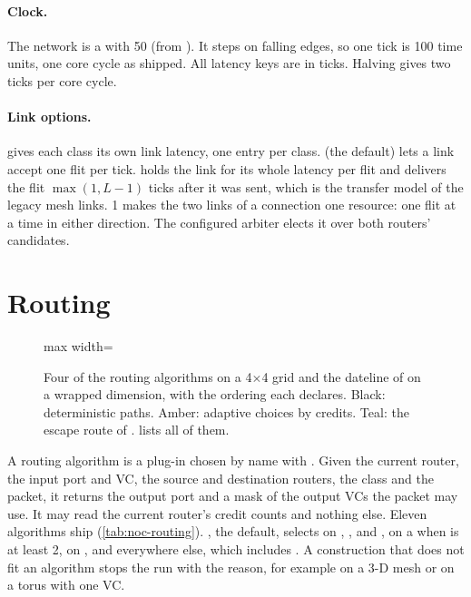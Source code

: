 \paragraph{Clock.} The network is a  with  50 (from
). It steps on falling edges, so one tick is 100 time units, one core cycle as
shipped. All latency keys are in ticks. Halving  gives two ticks per core
cycle.

\paragraph{Link options.}  gives each class its own link latency,
one entry per class.   (the default) lets a link accept one flit
per tick.  holds the link for its whole latency per flit and delivers the flit
$\max(1, L-1)$ ticks after it was sent, which is the transfer model of the legacy mesh links.
 1 makes the two links of a connection one resource: one flit at a time in either
direction. The configured arbiter elects it over both routers' candidates.

\section{Routing}\label{sec:noc-routing}

\begin{figure}[htbp]\centering
\begin{adjustbox}{max width=\textwidth}\end{adjustbox}
\caption{Four of the routing algorithms on a 4$\times$4 grid and the dateline of  on a
wrapped dimension, with the ordering each declares. Black: deterministic paths. Amber: adaptive
choices by credits. Teal: the escape route of . 
lists all of them.}
\label{fig:noc-routing}
\end{figure}

A routing algorithm is a plug-in chosen by name with . Given the current router, the
input port and VC, the source and destination routers, the class and the packet, it returns the
output port and a mask of the output VCs the packet may use. It may read the current router's
credit counts and nothing else. Eleven algorithms ship (\cref{tab:noc-routing}).
, the default, selects  on , ,  and
,  on a  when  is at least 2,  on
, and  everywhere else, which includes . A construction that does not fit an algorithm stops the run with
the reason, for example  on a 3-D mesh or  on a torus with one VC.

